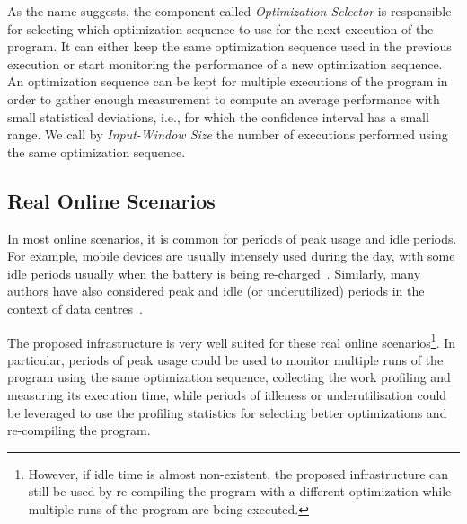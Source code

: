 As the name suggests, the component called \textit{Optimization Selector} is responsible for selecting which optimization sequence to use for the next execution of the program.
It can either keep the same optimization sequence used in the previous execution or start monitoring the performance of a new optimization sequence.
An optimization sequence can be kept for multiple executions of the program in order to gather enough measurement to compute an average performance with small statistical deviations, i.e., for which the confidence interval has a small range.
We call by \textit{Input-Window Size} the number of executions performed using the same optimization sequence.

\subsection{Real Online Scenarios}

In most online scenarios, it is common for periods of peak usage and idle periods.
For example, mobile devices are usually intensely used during the day, with some idle periods usually when the battery is being re-charged~\citep{mpeis16}.
Similarly, many authors have also considered peak and idle (or underutilized) periods in the context of data centres~\citep{armbrust10,chen12b}.

The proposed infrastructure is very well suited for these real online scenarios\footnote{
However, if idle time is almost non-existent, the proposed infrastructure can still be used by re-compiling the program with a different optimization while multiple runs of the program are being executed.}.
In particular, periods of peak usage could be used to monitor multiple runs of the program using the same optimization sequence, collecting the work profiling and measuring its execution time,
while periods of idleness or underutilisation could be leveraged to use the profiling statistics for selecting better optimizations and re-compiling the program.
